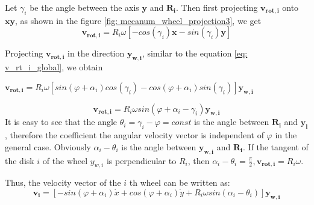 \documentclass[oneside,final,14pt]{extreport}
\newcommand{\bs}{\boldsymbol}
\begin{document}
\begin{figure} [H]
\end{figure}

Let $ \gamma_{i} $ be the angle between the axis $ \bs{y} $ and $ \bs{R_{i}} $. Then first projecting $ \bs{v_{rot, i}} $ onto $ \bs{xy} $, as shown in the figure \ref{fig: mecanum_wheel_projection3}, we get
\begin{equation}
\bs{v_{rot, i}}
=
R_{i}
\omega
[
-cos (\gamma_{i})
\bs{x}
-
sin (\gamma_{i})
\bs{y}
]
\end{equation}

Projecting $ \bs{v_{rot, i}} $ in the direction $ \bs{y_{w, i}} $, similar to the equation \ref{eq: v_rt_i_global}, we obtain
\begin{center}
$
\bs{v_{rot, i}}
=
R_{i}
\omega
[
sin(\varphi + \alpha_{i})
cos (\gamma_{i})
-
cos (\varphi + \alpha_{i})
sin (\gamma_{i})
]
\bs{y_{w, i}}
$
\end{center}
\begin{equation}
\bs{v_{rot, i}}
=
R_{i}
\omega
sin (\varphi + \alpha_{i} - \gamma_{i})
\bs{y_{w, i}}
\end{equation}
It is easy to see that the angle $ \theta_{i} = \gamma_{i} - \varphi = const $ is the angle between $ \bs{R_{i}} $ and $ \bs{y_{l}} $, therefore the coefficient the angular velocity vector is independent of $ \varphi $ in the general case. Obviously $ \alpha_{i} - \theta_{i} $ is the angle between $ \bs{y_{w, i}} $ and $ \bs{R_{i}} $. If the tangent of the disk $ i $ of the wheel $ y_{w, i} $ is perpendicular to $ R_{i} $, then $ \alpha_{i} - \theta_{i} = \frac{\pi}{2}, \bs{v_{rot, i}} = R_{i} \omega $.
\iffalse
 Also fair
\begin{gather}
\dot{x}
=
v_{x} \bs{x}
\\
\dot{y}
=
v_{y} \bs{y}
\\
\dot{\varphi}
=
\omega \bs{z}
\end{gather}
Where $ v_{x} $, $ v_{x} $, $ \omega $ is the velocity value in the direction of $ \bs{x} $ and $ \bs{y} $, respectively, $ \omega $ is the angular velocity value.
\fi

Thus, the velocity vector of the $ i $ th wheel can be written as:
\begin{equation}
\label{eq: local_v_global}
\bs{v_{i}}
=
[
-sin (\varphi + \alpha_{i}) \dot{x}
+ cos (\varphi + \alpha_{i}) \dot{y}
+
R_{i}
\omega
sin (\alpha_{i} - \theta_{i})
]
\bs{y_{w, i}}
\end{equation}
\end{document}
